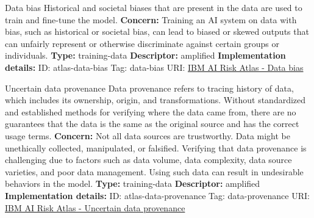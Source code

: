 \documentclass[a4paper,12pt]{article}
\begin{document}
\begin{definitionbox}{Data bias}
Historical and societal biases that are present in the data are used to train and fine-tune the model.
\newline\newline
\textbf{Concern: }Training an AI system on data with bias, such as historical or societal bias, can lead to biased or skewed outputs that can unfairly represent or otherwise discriminate against certain groups or individuals.\newline\newline
\textbf{Type: }training-data\newline
\textbf{Descriptor: }amplified \newline\newline
\textbf{Implementation details: } \newline
ID: atlas-data-bias \newline
Tag: data-bias \newline
URI:  \href{https://www.ibm.com/docs/en/watsonx/saas?topic=SSYOK8/wsj/ai-risk-atlas/data-bias.html}{IBM AI Risk Atlas - Data bias}\newline
\end{definitionbox}
\begin{definitionbox}{Uncertain data provenance}
Data provenance refers to tracing history of data, which includes its ownership, origin, and transformations. Without standardized and established methods for verifying where the data came from, there are no guarantees that the data is the same as the original source and has the correct usage terms.\newline\newline
\textbf{Concern: }Not all data sources are trustworthy. Data might be unethically collected, manipulated, or falsified. Verifying that data provenance is challenging due to factors such as data volume, data complexity, data source varieties, and poor data management. Using such data can result in undesirable behaviors in the model.\newline\newline
\textbf{Type: }training-data\newline
\textbf{Descriptor: }amplified \newline\newline
\textbf{Implementation details: } \newline
ID: atlas-data-provenance \newline
Tag: data-provenance \newline
URI:  \href{https://www.ibm.com/docs/en/watsonx/saas?topic=SSYOK8/wsj/ai-risk-atlas/data-provenance.html}{IBM AI Risk Atlas - Uncertain data provenance}\newline
\end{definitionbox}
\end{document}
